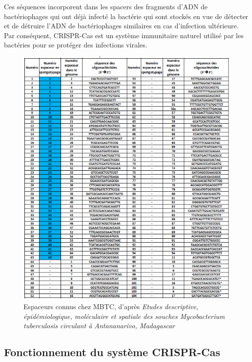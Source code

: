 \documentclass[twoside,a4paper,11pt,frenchb,openany]{report}
\begin{document}
Ces séquences incorporent dans les spacers des fragments d'ADN de bactériophages qui ont déjà infecté la bactérie qui sont stockés en vue de détecter et de détruire l'ADN de bactériophages similaires en cas d'infection ultérieure. Par conséquent, CRISPR-Cas est un système immunitaire naturel utilisé par les bactéries pour se protéger des infections virales. 

\begin{figure}[h!]
\centering
\includegraphics[scale=0.7]{spacer.png}
\caption{Espaceurs connus chez MBTC, d'après \textit{Etudes descriptive, épidémiologique, moléculaire et spatiale des souches Mycobacterium tuberculosis circulant à Antananarivo, Madagascar}}
\end{figure}


\subsection{Fonctionnement du système CRISPR-Cas}
\end{document}
